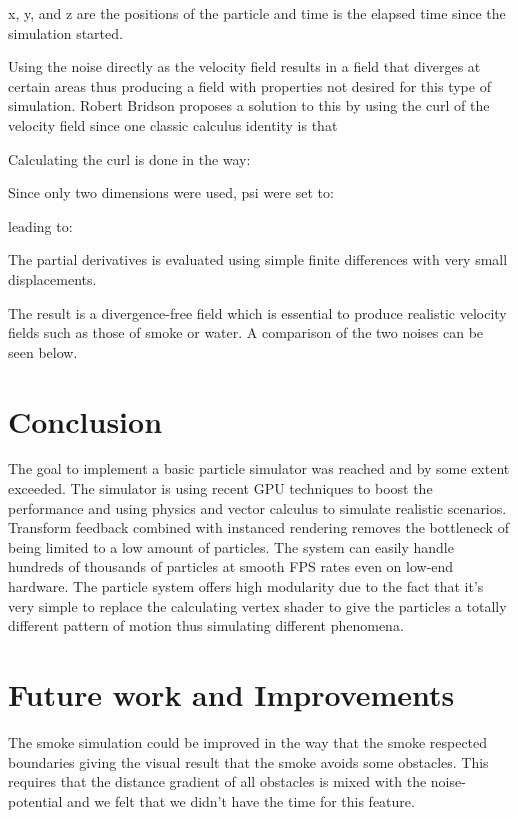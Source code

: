\documentclass[journal]{vgtc}                %
\begin{document}

x, y, and z are the positions of the particle and time is the elapsed time since the simulation started.

Using the noise directly as the velocity field results in a field that diverges at certain areas thus producing a field with properties not desired for this type of simulation. Robert Bridson proposes a solution to this by using the curl of the velocity field since one classic calculus identity is that


Calculating the curl is done in the way:

Since only two dimensions were used, psi were set to:


leading to:

The partial derivatives is evaluated using simple finite differences with very small displacements. 

The result is a divergence-free field which is essential to produce realistic velocity fields such  as those of smoke or water.  A comparison of the two noises can be seen below.



\section{Conclusion}
The goal to implement a basic particle simulator was reached and by some extent exceeded. The simulator is using recent GPU techniques to boost the performance and using physics and vector calculus to simulate realistic scenarios. Transform feedback combined with instanced rendering removes the bottleneck of being limited to a low amount of particles. The system can easily handle hundreds of thousands of particles at smooth FPS rates even on low-end hardware. The particle system offers high modularity due to the fact that it’s very simple to replace the calculating vertex shader to give the particles a totally different pattern of motion thus simulating different phenomena.

\section{Future work and Improvements}
The smoke simulation could be improved in the way that the smoke respected boundaries giving the visual result that the smoke avoids some obstacles. This requires that the distance gradient of all obstacles is mixed with the noise-potential and we felt that we didn’t have the time for this feature. 
\end{document}
